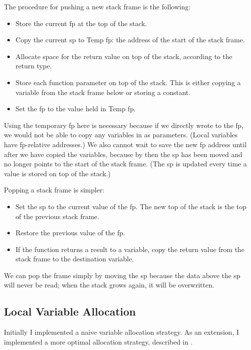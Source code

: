 \documentclass[00-main.tex]{subfiles}
\begin{document}
The procedure for pushing a new stack frame is the following:

\begin{itemize}[nosep]
\item
Store the current \gls{fp} at the top of the stack.
\item
Copy the current \gls{sp} to Temp \gls{fp}: the address of the start of the stack frame.
\item
Allocate space for the return value on top of the stack, according to the return type.
\item
Store each function parameter on top of the stack.
This is either copying a variable from the stack frame below or storing a constant.
\item
Set the \gls{fp} to the value held in Temp \gls{fp}.
\end{itemize}

Using the temporary \gls{fp} here is necessary because if we directly wrote to the \gls{fp}, we would not be able to copy any variables in as parameters.
(Local variables have \gls{fp}-relative addresses.)
We also cannot wait to save the new \gls{fp} address until after we have copied the variables, because by then the \gls{sp} has been moved and no longer points to the start of the stack frame.
(The \gls{sp} is updated every time a value is stored on top of the stack.)

Popping a stack frame is simpler:

\begin{itemize}[nosep]
\item
Set the \gls{sp} to the current value of the \gls{fp}.
The new top of the stack is the top of the previous stack frame.
\item
Restore the previous value of the \gls{fp}.
\item
If the function returns a result to a variable, copy the return value from the stack frame to the destination variable.
\end{itemize}

We can pop the frame simply by moving the \gls{sp} because the data above the \gls{sp} will never be read; when the stack grows again, it will be overwritten.

\subsection{Local Variable Allocation}
\label{sec:impl:local variable allocation}

Initially I implemented a naive variable allocation strategy.
As an extension, I implemented a more optimal allocation strategy, described in .
\end{document}
